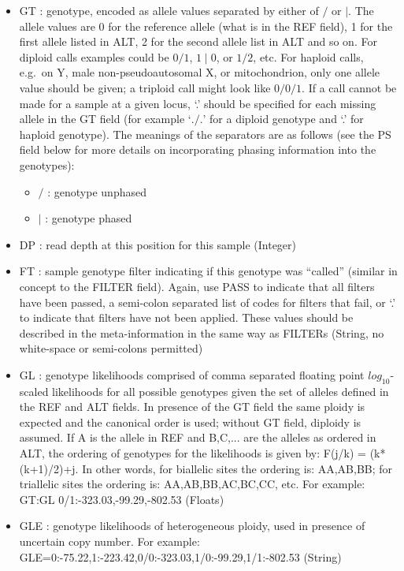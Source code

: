 \documentclass[8pt]{article}
\begin{document}
\begin{itemize}
\renewcommand{\labelitemii}{$\circ$}
  \item GT : genotype, encoded as allele values separated by either of $/$ or $\mid$. The allele values are 0 for the reference allele (what is in the REF field), 1 for the first allele listed in ALT, 2 for the second allele list in ALT and so on. For diploid calls examples could be $0/1$, $1\mid0$, or $1/2$, etc. For haploid calls, e.g.\ on Y, male non-pseudoautosomal X, or mitochondrion, only one allele value should be given; a triploid call might look like $0/0/1$. If a call cannot be made for a sample at a given locus, `.' should be specified for each missing allele in the GT field (for example `$./.$' for a diploid genotype and `.' for haploid genotype). The meanings of the separators are as follows (see the PS field below for more details on incorporating phasing information into the genotypes):
	\begin{itemize}
	  \item $/$ : genotype unphased
	  \item $\mid$ : genotype phased
	\end{itemize}
  \item DP : read depth at this position for this sample (Integer)
  \item FT : sample genotype filter indicating if this genotype was ``called'' (similar in concept to the FILTER field). Again, use PASS to indicate that all filters have been passed, a semi-colon separated list of codes for filters that fail, or `.' to indicate that filters have not been applied. These values should be described in the meta-information in the same way as FILTERs (String, no white-space or semi-colons permitted)
  \item GL : genotype likelihoods comprised of comma separated floating point $log_{10}$-scaled likelihoods for all possible genotypes given the set of alleles defined in the REF and ALT fields. In presence of the GT field the same ploidy is expected and the canonical order is used; without GT field, diploidy is assumed. If A is the allele in REF and B,C,... are the alleles as ordered in ALT, the ordering of genotypes for the likelihoods is given by: F(j/k) = (k*(k+1)/2)+j.  In other words, for biallelic sites the ordering is: AA,AB,BB; for triallelic sites the ordering is: AA,AB,BB,AC,BC,CC, etc.  For example: GT:GL 0/1:-323.03,-99.29,-802.53 (Floats)
  \item GLE : genotype likelihoods of heterogeneous ploidy, used in presence of uncertain copy number. For example: GLE=0:-75.22,1:-223.42,0/0:-323.03,1/0:-99.29,1/1:-802.53 (String)

\end{itemize}
\end{document}
